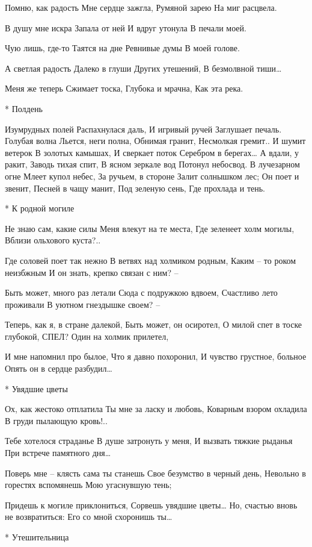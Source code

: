 Помню, как радость
Мне сердце зажгла,
Румяной зарею
На миг расцвела.

В душу мне искра
Запала от ней
И вдруг утонула
В печали моей.

Чую лишь, где-то
Таятся на дне
Ревнивые думы
В моей голове.

А светлая радость
Далеко в глуши
Других утешений,
В безмолвной тиши…

Меня же теперь
Сжимает тоска,
Глубока и мрачна,
Как эта река.


* Полдень

Изумрудных полей
Распахнулася даль,
И игривый ручей
Заглушает печаль.
Голубая волна
Льется, неги полна,
Обнимая гранит,
Несмолкая гремит..
И шумит ветерок
В золотых камышах,
И сверкает поток
Серебром в берегах…
А вдали, у ракит,
Заводь тихая спит,
В ясном зеркале вод
Потонул небосвод.
В лучезарном огне
Млеет купол небес,
За ручьем, в стороне
Залит солнышком лес;
Он поет и звенит,
Песней в чащу манит,
Под зеленую сень,
Где прохлада и тень.


* К родной могиле

Не знаю сам, какие силы
Меня влекут на те места,
Где зеленеет холм могилы,
Вблизи ольхового куста?..

Где соловей поет так нежно
В ветвях над холмиком родным,
Каким – то роком неизбжным
И он знать, крепко связан с ним? –

Быть может, много раз летали
Сюда с подружкою вдвоем,
Счастливо лето проживали
В уютном гнездышке своем? –

Теперь, как я, в стране далекой,
Быть может, он осиротел,
О милой спет в тоске глубокой, СПЕЛ?
Один на холмик прилетел,

И мне напомнил про былое,
Что я давно похоронил,
И чувство грустное, больное
Опять он в сердце разбудил…



* Увядшие цветы

Ох, как жестоко отплатила
Ты мне за ласку и любовь,
Коварным взором охладила
В груди пылающую кровь!..

Тебе хотелося страданье
В душе затронуть у меня,
И вызвать тяжкие рыданья
При встрече памятного дня…

Поверь мне – клясть сама ты станешь
Свое безумство в черный день,
Невольно в горестях вспомянешь
Мою угаснувшую тень;

Придешь к могиле приклониться,
Сорвешь увядшие цветы…
Но, счастью вновь не возвратиться:
Его со мной схоронишь ты…


* Утешительница

